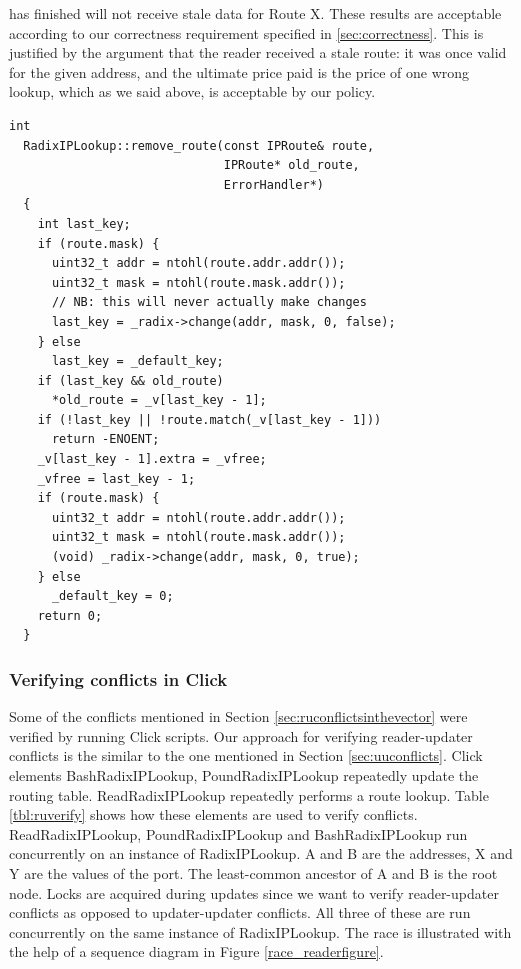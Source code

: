 \documentclass[a4paper]{article}
\begin{document}
has finished will not receive stale data for Route X. These results are acceptable according
to our correctness requirement specified in \ref{sec:correctness}.
This is justified by the argument that the reader received
a stale route: it was once valid for the given address, and the
ultimate price paid is the price of one wrong lookup, which as we said above, is acceptable by our policy.
\begin{lstlisting}[caption= The remove\_route() function, label=removeroute,float=tph]
  int
  RadixIPLookup::remove_route(const IPRoute& route, 
                              IPRoute* old_route, 
                              ErrorHandler*)
  {
    int last_key;
    if (route.mask) {
      uint32_t addr = ntohl(route.addr.addr());
      uint32_t mask = ntohl(route.mask.addr());
      // NB: this will never actually make changes
      last_key = _radix->change(addr, mask, 0, false);
    } else
      last_key = _default_key;
    if (last_key && old_route)
      *old_route = _v[last_key - 1];
    if (!last_key || !route.match(_v[last_key - 1]))
      return -ENOENT;
    _v[last_key - 1].extra = _vfree;
    _vfree = last_key - 1;
    if (route.mask) {
      uint32_t addr = ntohl(route.addr.addr());
      uint32_t mask = ntohl(route.mask.addr());
      (void) _radix->change(addr, mask, 0, true);
    } else
      _default_key = 0;
    return 0;
  }
\end{lstlisting}

\subsubsection{Verifying conflicts in Click}
Some of the conflicts mentioned in Section \ref{sec:ruconflictsinthevector} were verified by running Click scripts. Our approach for verifying reader-updater conflicts is the similar to the one mentioned in Section \ref{sec:uuconflicts}. Click elements BashRadixIPLookup, PoundRadixIPLookup repeatedly update the routing table. ReadRadixIPLookup repeatedly performs a route lookup. Table \ref{tbl:ruverify} shows how these elements are used to verify conflicts. ReadRadixIPLookup, PoundRadixIPLookup and BashRadixIPLookup run concurrently on an instance of RadixIPLookup. A and B are the addresses, X and Y are the values of the port. The least-common ancestor of A and B is the root node. Locks are acquired during updates since we want to verify reader-updater conflicts as opposed to updater-updater conflicts. All three of these are run concurrently on the same instance of RadixIPLookup. The race is illustrated with the help of a sequence diagram in Figure \ref{race_readerfigure}.\\
\end{document}
